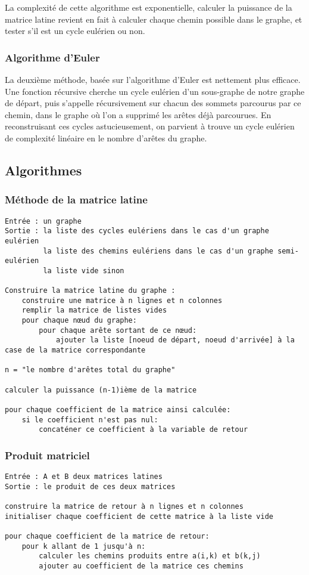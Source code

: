 \documentclass{scrartcl}
\begin{document}
	  La complexité de cette algorithme est exponentielle, calculer la puissance
	  de la matrice latine revient en fait à calculer chaque chemin possible dans
	  le graphe, et tester s'il est un cycle eulérien ou non.
	
    \subsubsection{Algorithme d'Euler}
      La deuxième méthode, basée sur l'algorithme d'Euler est nettement plus
      efficace. Une fonction récursive cherche un cycle eulérien d'un
      sous-graphe de notre graphe de départ, puis s'appelle récursivement sur
      chacun des sommets parcourus par ce chemin, dans le graphe où l'on a
      supprimé les arêtes déjà parcourues. En reconstruisant ces cycles
      astucieusement, on parvient à trouve un cycle eulérien de complexité
      linéaire en le nombre d'arêtes du graphe. 

  \subsection{Algorithmes}
    \subsubsection{Méthode de la matrice latine}
      \begin{lstlisting}
Entrée : un graphe
Sortie : la liste des cycles eulériens dans le cas d'un graphe eulérien
         la liste des chemins eulériens dans le cas d'un graphe semi-eulérien
         la liste vide sinon

Construire la matrice latine du graphe :
    construire une matrice à n lignes et n colonnes
    remplir la matrice de listes vides
    pour chaque nœud du graphe:
        pour chaque arête sortant de ce nœud:
            ajouter la liste [noeud de départ, noeud d'arrivée] à la case de la matrice correspondante

n = "le nombre d'arêtes total du graphe"

calculer la puissance (n-1)ième de la matrice

pour chaque coefficient de la matrice ainsi calculée:
    si le coefficient n'est pas nul:
        concaténer ce coefficient à la variable de retour
      \end{lstlisting}

    \subsubsection{Produit matriciel}
      \begin{lstlisting}
Entrée : A et B deux matrices latines
Sortie : le produit de ces deux matrices

construire la matrice de retour à n lignes et n colonnes
initialiser chaque coefficient de cette matrice à la liste vide

pour chaque coefficient de la matrice de retour:
    pour k allant de 1 jusqu'à n:
        calculer les chemins produits entre a(i,k) et b(k,j)
        ajouter au coefficient de la matrice ces chemins
      \end{lstlisting}
\end{document}
